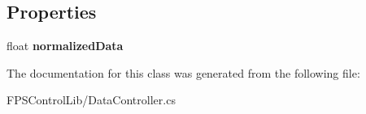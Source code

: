 \subsection*{Properties}
\begin{DoxyCompactItemize}
\item 
\hypertarget{class_f_p_s_control_1_1_data_controller_a54ea339bebb1ad536411d79f01836eaa}{float {\bfseries normalized\-Data}}\label{class_f_p_s_control_1_1_data_controller_a54ea339bebb1ad536411d79f01836eaa}

\end{DoxyCompactItemize}


The documentation for this class was generated from the following file\-:\begin{DoxyCompactItemize}
\item 
F\-P\-S\-Control\-Lib/Data\-Controller.\-cs\end{DoxyCompactItemize}
